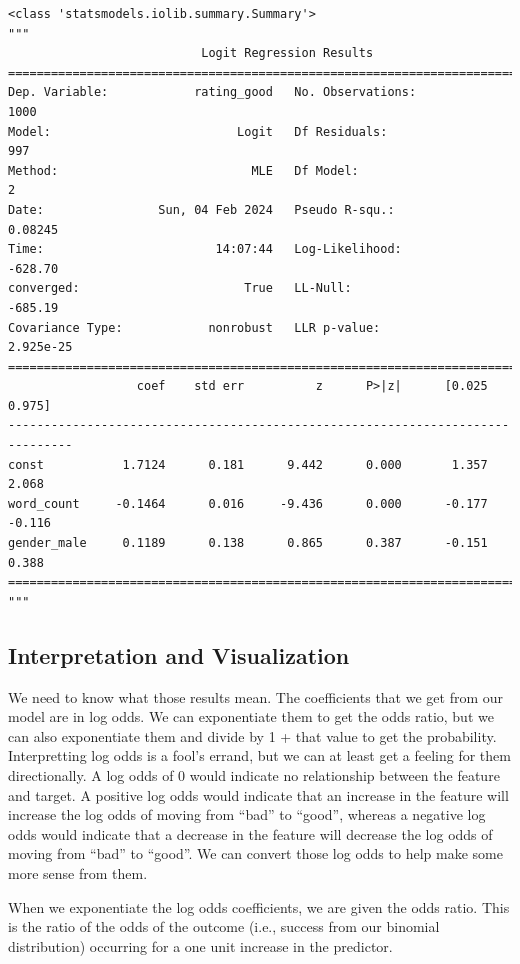 \documentclass[
  letterpaper,
]{krantz}
\begin{document}
\begin{verbatim}
<class 'statsmodels.iolib.summary.Summary'>
"""
                           Logit Regression Results                           
==============================================================================
Dep. Variable:            rating_good   No. Observations:                 1000
Model:                          Logit   Df Residuals:                      997
Method:                           MLE   Df Model:                            2
Date:                Sun, 04 Feb 2024   Pseudo R-squ.:                 0.08245
Time:                        14:07:44   Log-Likelihood:                -628.70
converged:                       True   LL-Null:                       -685.19
Covariance Type:            nonrobust   LLR p-value:                 2.925e-25
===============================================================================
                  coef    std err          z      P>|z|      [0.025      0.975]
-------------------------------------------------------------------------------
const           1.7124      0.181      9.442      0.000       1.357       2.068
word_count     -0.1464      0.016     -9.436      0.000      -0.177      -0.116
gender_male     0.1189      0.138      0.865      0.387      -0.151       0.388
===============================================================================
"""
\end{verbatim}

\subsection{Interpretation and
Visualization}\label{sec-glm-binomial-interpret}

We need to know what those results mean. The coefficients that we get
from our model are in log odds. We can exponentiate them to get the odds
ratio, but we can also exponentiate them and divide by 1 + that value to
get the probability. Interpretting log odds is a fool's errand, but we
can at least get a feeling for them directionally. A log odds of 0 would
indicate no relationship between the feature and target. A positive log
odds would indicate that an increase in the feature will increase the
log odds of moving from ``bad'' to ``good'', whereas a negative log odds
would indicate that a decrease in the feature will decrease the log odds
of moving from ``bad'' to ``good''. We can convert those log odds to
help make some more sense from them.

When we exponentiate the log odds coefficients, we are given the odds
ratio. This is the ratio of the odds of the outcome (i.e., success from
our binomial distribution) occurring for a one unit increase in the
predictor.
\end{document}
